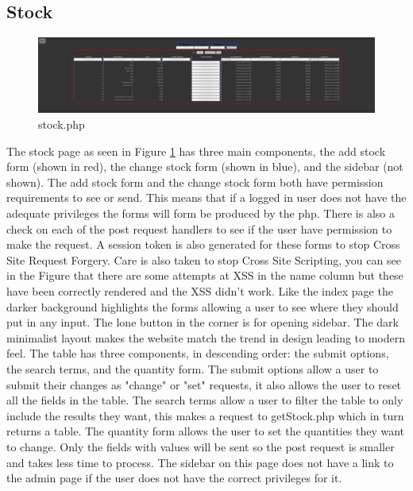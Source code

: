 \documentclass[12pt,a4paper]{report}
\begin{document}
	\subsection{Stock}
	\begin{figure}[!ht]
		\centering
		\hspace*{-1in}
		\includegraphics[width=170mm]{img/stock.png}
		\caption{stock.php \label{stock.php}}
	\end{figure}
	The stock page as seen in Figure \ref{stock.php} has three main components, the add stock form (shown in red), the change stock form (shown in blue), and the sidebar (not shown). The add stock form and the change stock form both have permission requirements to see or send. This means that if a logged in user does not have the adequate privileges the forms will form be produced by the php. There is also a check on each of the post request handlers to see if the user have permission to make the request. A session token is also generated for these forms to stop Cross Site Request Forgery. Care is also taken to stop Cross Site Scripting, you can see in the Figure that there are some attempts at XSS in the name column but these have been correctly rendered and the XSS didn't work. Like the index page the darker background highlights the forms allowing a user to see where they should put in any input. The lone button in the corner is for opening sidebar. The dark minimalist layout makes the website match the trend in design leading to modern feel. The table has three components, in descending order: the submit options, the search terms, and the quantity form. The submit options allow a user to submit their changes as "change" or "set" requests, it also allows the user to reset all the fields in the table. The search terms allow a user to filter the table to only include the results they want, this makes a request to getStock.php which in turn returns a table. The quantity form allows the user to set the quantities they want to change. Only the fields with values will be sent so the post request is smaller and takes less time to process. The sidebar on this page does not have a link to the admin page if the user does not have the correct privileges for it.
\end{document}
